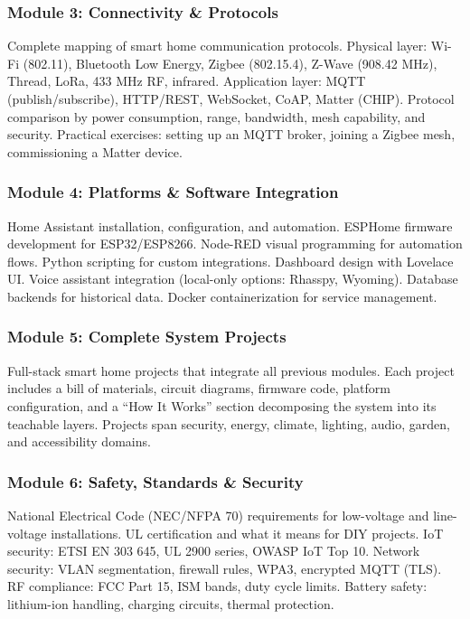 \documentclass[11pt,letterpaper]{article}
\begin{document}
\subsubsection{Module 3: Connectivity \& Protocols}
Complete mapping of smart home communication protocols. Physical layer: Wi-Fi (802.11), Bluetooth Low Energy, Zigbee (802.15.4), Z-Wave (908.42 MHz), Thread, LoRa, 433 MHz RF, infrared. Application layer: MQTT (publish/subscribe), HTTP/REST, WebSocket, CoAP, Matter (CHIP). Protocol comparison by power consumption, range, bandwidth, mesh capability, and security. Practical exercises: setting up an MQTT broker, joining a Zigbee mesh, commissioning a Matter device.

\subsubsection{Module 4: Platforms \& Software Integration}
Home Assistant installation, configuration, and automation. ESPHome firmware development for ESP32/ESP8266. Node-RED visual programming for automation flows. Python scripting for custom integrations. Dashboard design with Lovelace UI. Voice assistant integration (local-only options: Rhasspy, Wyoming). Database backends for historical data. Docker containerization for service management.

\subsubsection{Module 5: Complete System Projects}
Full-stack smart home projects that integrate all previous modules. Each project includes a bill of materials, circuit diagrams, firmware code, platform configuration, and a ``How It Works'' section decomposing the system into its teachable layers. Projects span security, energy, climate, lighting, audio, garden, and accessibility domains.

\subsubsection{Module 6: Safety, Standards \& Security}
National Electrical Code (NEC/NFPA 70) requirements for low-voltage and line-voltage installations. UL certification and what it means for DIY projects. IoT security: ETSI EN 303 645, UL 2900 series, OWASP IoT Top 10. Network security: VLAN segmentation, firewall rules, WPA3, encrypted MQTT (TLS). RF compliance: FCC Part 15, ISM bands, duty cycle limits. Battery safety: lithium-ion handling, charging circuits, thermal protection.
\end{document}
